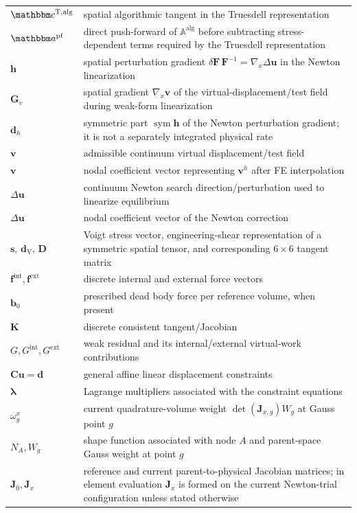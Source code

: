 \documentclass[11pt,a4paper]{article}
\newcommand{\bs}[1]{\boldsymbol{#1}}
\newcommand{\vct}[1]{\mathbf{#1}}
\begin{document}
\begin{longtable}{>{\raggedright\arraybackslash}p{3.0cm}>{\raggedright\arraybackslash}p{10.8cm}}
$\mathbbm c^{\mathrm{T,alg}}$ & spatial algorithmic tangent in the Truesdell representation \\
$\mathbbm a^{\mathrm{pf}}$ & direct push-forward of $\mathbb A^{\mathrm{alg}}$ before subtracting stress-dependent terms required by the Truesdell representation \\
$\bs h$ & spatial perturbation gradient $\delta\bs F\,\bs F^{-1}=\nabla_x\Delta\bs u$ in the Newton linearization \\
$\bs G_v$ & spatial gradient $\nabla_x\bs v$ of the virtual-displacement/test field during weak-form linearization \\
$\bs d_h$ & symmetric part $\operatorname{sym}\bs h$ of the Newton perturbation gradient; it is not a separately integrated physical rate \\
$\bs v$ & admissible continuum virtual displacement/test field \\
$\vct v$ & nodal coefficient vector representing $\bs v^h$ after FE interpolation \\
$\Delta\bs u$ & continuum Newton search direction/perturbation used to linearize equilibrium \\
$\Delta\vct u$ & nodal coefficient vector of the Newton correction \\
$\vct s$, $\vct d_{\mathrm V}$, $\vct D$ & Voigt stress vector, engineering-shear representation of a symmetric spatial tensor, and corresponding $6\times6$ tangent matrix \\
$\vct f^{\mathrm{int}},\vct f^{\mathrm{ext}}$ & discrete internal and external force vectors \\
$\bs b_0$ & prescribed dead body force per reference volume, when present \\
$\vct K$ & discrete consistent tangent/Jacobian \\
$G,G^{\mathrm{int}},G^{\mathrm{ext}}$ & weak residual and its internal/external virtual-work contributions \\
$\vct C\vct u=\vct d$ & general affine linear displacement constraints \\
$\vct\lambda$ & Lagrange multipliers associated with the constraint equations \\
$\omega_g^x$ & current quadrature-volume weight $\det(\vct J_{x,g})W_g$ at Gauss point $g$ \\
$N_A, W_g$ & shape function associated with node $A$ and parent-space Gauss weight at point $g$ \\
$\vct J_0,\vct J_x$ & reference and current parent-to-physical Jacobian matrices; in element evaluation $\vct J_x$ is formed on the current Newton-trial configuration unless stated otherwise \\

\end{longtable}
\end{document}
